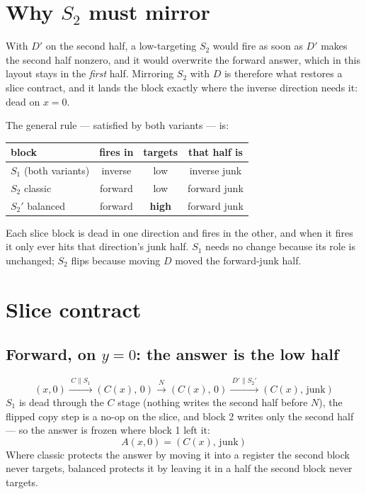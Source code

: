 \documentclass[11pt]{article}
\begin{document}
\section{Why $S_2$ must mirror}

With $D'$ on the second half, a low-targeting $S_2$ would fire as soon as $D'$
makes the second half nonzero, and it would overwrite the forward answer, which
in this layout stays in the \emph{first} half. Mirroring $S_2$ with $D$ is
therefore what restores a slice contract, and it lands the block exactly where
the inverse direction needs it: dead on $x=0$.

The general rule --- satisfied by both variants --- is:

\begin{center}
\begin{tabular}{lccc}
\toprule
block & fires in & targets & that half is \\
\midrule
$S_1$ (both variants) & inverse & low  & inverse junk \\
$S_2$  classic        & forward & low  & forward junk \\
$S_2'$ balanced       & forward & \textbf{high} & forward junk \\
\bottomrule
\end{tabular}
\end{center}

\noindent Each slice block is dead in one direction and fires in the other, and
when it fires it only ever hits that direction's junk half. $S_1$ needs no
change because its role is unchanged; $S_2$ flips because moving $D$ moved the
forward-junk half.

\section{Slice contract}

\subsection*{Forward, on $y=0$: the answer is the low half}

\[
(x,0)
\xrightarrow{\;C \parallel S_1\;} (C(x),\,0)
\xrightarrow{\;N\;} (C(x),\,0)
\xrightarrow{\;D' \parallel S_2'\;} (C(x),\,\text{junk})
\]
$S_1$ is dead through the $C$ stage (nothing writes the second half before
$N$), the flipped copy step is a no-op on the slice, and block 2 writes only
the second half --- so the answer is frozen where block 1 left it:
\[
\boxed{\;A(x,0) = (C(x),\,\text{junk})\;}
\]
Where classic protects the answer by moving it into a register the second block
never targets, balanced protects it by leaving it in a half the second block
never targets.
\end{document}
